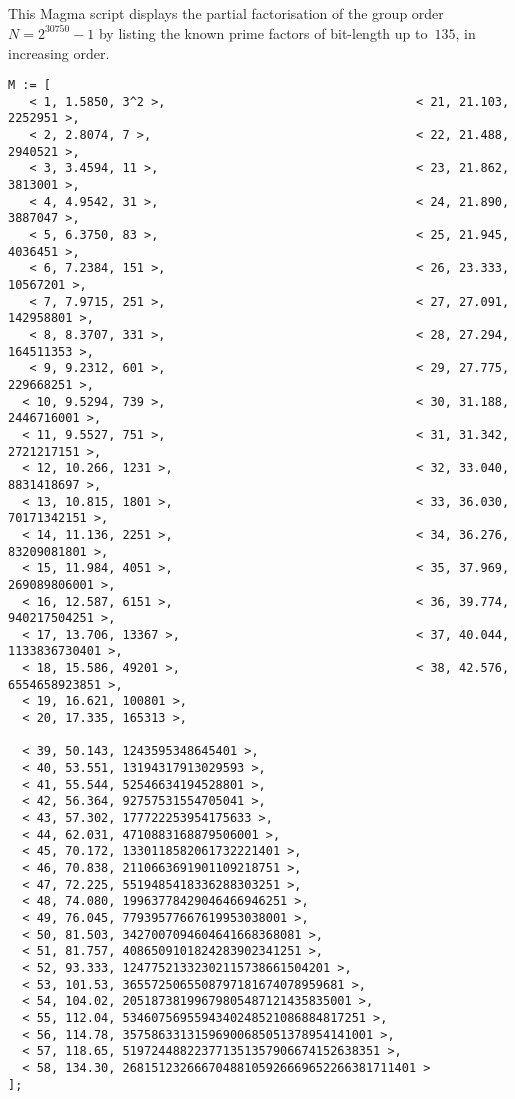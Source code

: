 \documentclass[11pt]{llncs}
\begin{document}
\begin{subappendices}
\renewcommand{\thesection}{\Alph{section}}
  
\section{}\label{app:A}

This Magma script displays the partial factorisation of the group
order $N = 2^{30750} \!-\! 1$ by listing the known prime factors of
bit-length up to~$135$, in increasing order.

{\scriptsize
\begin{verbatim}
M := [
   < 1, 1.5850, 3^2 >,                                   < 21, 21.103, 2252951 >,      
   < 2, 2.8074, 7 >,                                     < 22, 21.488, 2940521 >,      
   < 3, 3.4594, 11 >,                                    < 23, 21.862, 3813001 >,      
   < 4, 4.9542, 31 >,                                    < 24, 21.890, 3887047 >,      
   < 5, 6.3750, 83 >,                                    < 25, 21.945, 4036451 >,      
   < 6, 7.2384, 151 >,                                   < 26, 23.333, 10567201 >,     
   < 7, 7.9715, 251 >,                                   < 27, 27.091, 142958801 >,    
   < 8, 8.3707, 331 >,                                   < 28, 27.294, 164511353 >,    
   < 9, 9.2312, 601 >,                                   < 29, 27.775, 229668251 >,    
  < 10, 9.5294, 739 >,                                   < 30, 31.188, 2446716001 >,   
  < 11, 9.5527, 751 >,                                   < 31, 31.342, 2721217151 >,   
  < 12, 10.266, 1231 >,                                  < 32, 33.040, 8831418697 >,   
  < 13, 10.815, 1801 >,                                  < 33, 36.030, 70171342151 >,  
  < 14, 11.136, 2251 >,                                  < 34, 36.276, 83209081801 >,  
  < 15, 11.984, 4051 >,                                  < 35, 37.969, 269089806001 >, 
  < 16, 12.587, 6151 >,                                  < 36, 39.774, 940217504251 >, 
  < 17, 13.706, 13367 >,                                 < 37, 40.044, 1133836730401 >,
  < 18, 15.586, 49201 >,                                 < 38, 42.576, 6554658923851 >,
  < 19, 16.621, 100801 >,
  < 20, 17.335, 165313 >,

  < 39, 50.143, 1243595348645401 >,
  < 40, 53.551, 13194317913029593 >,
  < 41, 55.544, 52546634194528801 >,
  < 42, 56.364, 92757531554705041 >,
  < 43, 57.302, 177722253954175633 >,
  < 44, 62.031, 4710883168879506001 >,
  < 45, 70.172, 1330118582061732221401 >,
  < 46, 70.838, 2110663691901109218751 >,
  < 47, 72.225, 5519485418336288303251 >,
  < 48, 74.080, 19963778429046466946251 >,
  < 49, 76.045, 77939577667619953038001 >,
  < 50, 81.503, 3427007094604641668368081 >,
  < 51, 81.757, 4086509101824283902341251 >,
  < 52, 93.333, 12477521332302115738661504201 >,
  < 53, 101.53, 3655725065508797181674078959681 >,
  < 54, 104.02, 20518738199679805487121435835001 >,
  < 55, 112.04, 5346075695594340248521086884817251 >,
  < 56, 114.78, 35758633131596900685051378954141001 >,
  < 57, 118.65, 519724488223771351357906674152638351 >,
  < 58, 134.30, 26815123266670488105926669652266381711401 > 
];
\end{verbatim}}


\end{subappendices}
\end{document}
